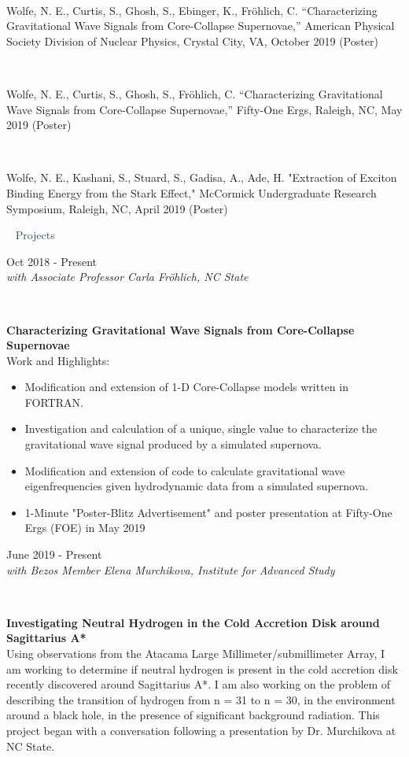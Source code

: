 \documentclass[8pt]{article}
\def \secondarycolor {darkslategray}
\def \tertiarycolor  {airforceblue} %
\def \leftcolwidth{3.05cm}
\newcommand{\cvsubtitle}[1]{
    \hspace{\leftcolwidth} \ \textcolor{\secondarycolor}{ \large{{#1}} }
}
\newcommand{\cventry}[4]{
    \begin{minipage}[t]{\leftcolwidth} 
        \small{
            \begin{flushright}
                #2\\
                \textcolor{\tertiarycolor}{\textit{#4}}
            \end{flushright}
        }
    \end{minipage} \ \
    \begin{minipage}[t]{\linewidth-\leftcolwidth} \normalsize{\textbf{#1} \\ #3} \end{minipage}
} %
\newcommand{\cventrysingle}[3]{
    \begin{minipage}[t]{\leftcolwidth} \small{#2 \begin{flushleft}\textcolor{\tertiarycolor}{\textit{#3}} \end{flushleft} } 
    \end{minipage} \ \
    \begin{minipage}[t]{\linewidth-\leftcolwidth} \normalsize{{#1}} \end{minipage}
}
\begin{document}
\cventrysingle{Wolfe, N. E., Curtis, S., Ghosh, S., Ebinger, K., Fr\"ohlich, C. “Characterizing Gravitational Wave Signals from Core-Collapse Supernovae,” American Physical Society Division of Nuclear Physics, Crystal City, VA, October 2019 (Poster)}{}{}

\cventrysingle{Wolfe, N. E., Curtis, S., Ghosh, S., Fr\"ohlich, C. “Characterizing Gravitational Wave Signals from Core-Collapse Supernovae,” Fifty-One Ergs, Raleigh, NC, May 2019 (Poster)}{}{}

\cventrysingle{Wolfe, N. E., Kashani, S., Stuard, S., Gadisa, A., Ade, H. "Extraction of Exciton Binding Energy from the Stark Effect," McCormick Undergraduate Research Symposium, Raleigh, NC, April 2019 (Poster)}{}{}

\cvsubtitle{Projects}

\cventry{Characterizing Gravitational Wave Signals from Core-Collapse Supernovae}{Oct 2018 - Present}
{Work and Highlights:
    \begin{itemize}
        \item{Modification and extension of 1-D Core-Collapse models written in FORTRAN.}
        \item{Investigation and calculation of a unique, single value to characterize the gravitational wave signal produced by a simulated supernova.}
        \item{Modification and extension of code to calculate gravitational wave eigenfrequencies given hydrodynamic data from a simulated supernova.}%
        \item{1-Minute "Poster-Blitz Advertisement" and poster presentation at Fifty-One Ergs (FOE) in May 2019}
    \end{itemize}
}{with Associate Professor Carla Fr\"ohlich, NC State}

\cventry{Investigating Neutral Hydrogen in the Cold Accretion Disk around Sagittarius A*}{June 2019 - Present}
{Using observations from the Atacama Large Millimeter/submillimeter Array, I am working to determine if neutral hydrogen is present in the cold accretion disk recently discovered around Sagittarius A*. I am also working on the problem of describing the transition of hydrogen from n = 31 to n = 30, in the environment around a black hole, in the presence of significant background radiation. This project began with a conversation following a presentation by Dr. Murchikova at NC State.
}{with Bezos Member Elena Murchikova, Institute for Advanced Study}
\end{document}
